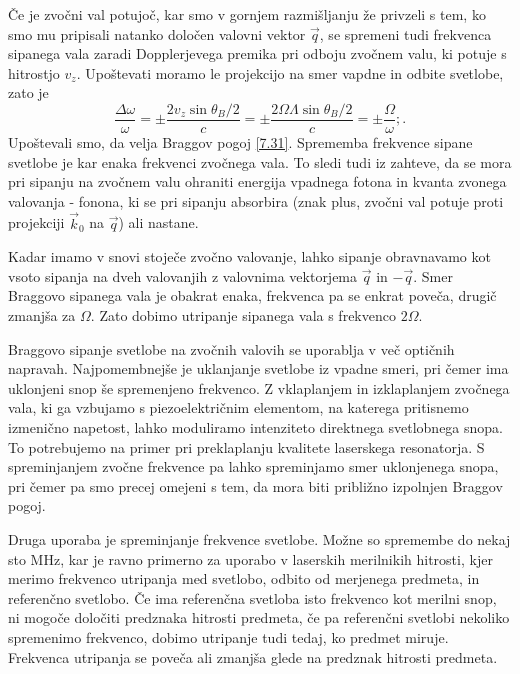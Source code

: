 \documentclass[11pt,fleqn]{book} %
\begin{document}
Če je zvočni val potujoč, kar smo v gornjem razmišljanju že privzeli
s tem, ko smo mu pripisali natanko določen valovni vektor $\vec{q}$,
se spremeni tudi frekvenca sipanega vala zaradi Dopplerjevega premika
pri odboju zvočnem valu, ki potuje s hitrostjo $v_{z}$. Upoštevati
moramo le projekcijo na smer vapdne in odbite svetlobe, zato je 
\begin{equation}
\frac{\Delta\omega}{\omega}=\pm\frac{2v_{z}\sin\theta_{B}/2}{c}=\pm\frac{2\Omega\Lambda\sin\theta_{B}/2}{c}=\pm\frac{\Omega}{\omega};.\label{7.32}
\end{equation}
 Upoštevali smo, da velja Braggov pogoj \ref{7.31}. Sprememba frekvence
sipane svetlobe je kar enaka frekvenci zvočnega vala. To sledi tudi
iz zahteve, da se mora pri sipanju na zvočnem valu ohraniti energija
vpadnega fotona in kvanta zvo\textquotedbl{}nega valovanja - fonona,
ki se pri sipanju absorbira (znak plus, zvočni val potuje proti projekciji
$\vec{k}_{0}$ na $\vec{q}$) ali nastane.

Kadar imamo v snovi stoječe zvočno valovanje, lahko sipanje obravnavamo
kot vsoto sipanja na dveh valovanjih z valovnima vektorjema $\vec{q}$
in $-\vec{q}$. Smer Braggovo sipanega vala je obakrat enaka, frekvenca
pa se enkrat poveča, drugič zmanjša za $\Omega$. Zato dobimo utripanje
sipanega vala s frekvenco $2\Omega$.

Braggovo sipanje svetlobe na zvočnih valovih se uporablja v več optičnih
napravah. Najpomembnejše je uklanjanje svetlobe iz vpadne smeri, pri
čemer ima uklonjeni snop še spremenjeno frekvenco. Z vklaplanjem in
izklaplanjem zvočnega vala, ki ga vzbujamo s piezoelektričnim elementom,
na katerega pritisnemo izmenično napetost, lahko moduliramo intenziteto
direktnega svetlobnega snopa. To potrebujemo na primer pri preklaplanju
kvalitete laserskega resonatorja. S spreminjanjem zvočne frekvence
pa lahko spreminjamo smer uklonjenega snopa, pri čemer pa smo precej
omejeni s tem, da mora biti približno izpolnjen Braggov pogoj.

Druga uporaba je spreminjanje frekvence svetlobe. Možne so spremembe
do nekaj sto MHz, kar je ravno primerno za uporabo v laserskih merilnikih
hitrosti, kjer merimo frekvenco utripanja med svetlobo, odbito od
merjenega predmeta, in referenčno svetlobo. Če ima referenčna svetloba
isto frekvenco kot merilni snop, ni mogoče določiti predznaka hitrosti
predmeta, če pa referenčni svetlobi nekoliko spremenimo frekvenco,
dobimo utripanje tudi tedaj, ko predmet miruje. Frekvenca utripanja
se poveča ali zmanjša glede na predznak hitrosti predmeta.
\end{document}
